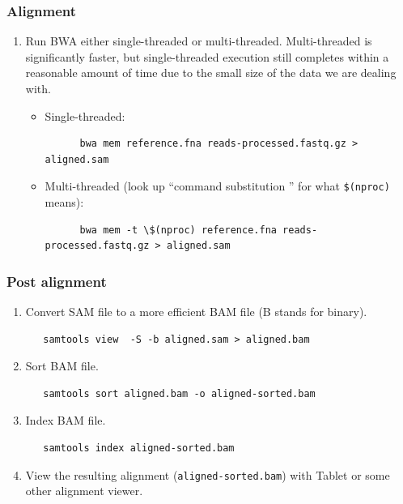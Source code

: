 \documentclass[12pt,letterpaper]{article}
\begin{document}
\subsubsection{Alignment}

\begin{enumerate}
   \item Run BWA either single-threaded or multi-threaded. Multi-threaded is significantly faster, but single-threaded execution still completes within a reasonable amount of time due to the small size of the data we are dealing with.
   \begin{itemize}
      \item Single-threaded:
      \begin{verbatim}
      bwa mem reference.fna reads-processed.fastq.gz > aligned.sam
      \end{verbatim}
      \item Multi-threaded (look up ``command substitution '' for what \texttt{\$(nproc)} means):
      \begin{verbatim}
      bwa mem -t \$(nproc) reference.fna reads-processed.fastq.gz > aligned.sam
      \end{verbatim}
   \end{itemize}
\end{enumerate}

\subsubsection{Post alignment}

\begin{enumerate}
   \item Convert SAM file to a more efficient BAM file (B stands for binary). \begin{verbatim}
   samtools view  -S -b aligned.sam > aligned.bam
   \end{verbatim}
   \item Sort BAM file. \begin{verbatim}
   samtools sort aligned.bam -o aligned-sorted.bam
   \end{verbatim}
   \item Index BAM file. \begin{verbatim}
   samtools index aligned-sorted.bam
   \end{verbatim}
   \item View the resulting alignment (\texttt{aligned-sorted.bam}) with Tablet or some other alignment viewer.
\end{enumerate}
\end{document}
